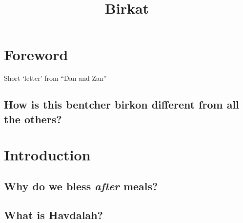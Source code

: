 ﻿\documentclass[a5paper, 12pt]{Birchon}
\title{Birkat}
\begin{document}
\fancyhead{} %
\cfoot{\thepage}


\begin{english}
{\tableofcontents}
\end{english}

\eject

\begin{english}
\section*{Foreword}
Short `letter' from ``Dan and Zan''

\subsection*{How is this bentcher birkon different from all the others?}

\section*{Introduction}
\subsection*{Why do we bless \emph{after} meals?}
\subsection*{What is Havdalah?}
\end{english}

\eject

\end{document}
